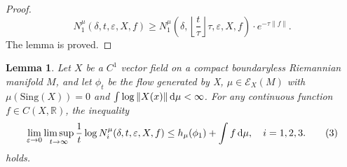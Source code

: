 \documentclass[10pt]{article}
\newtheorem*{Theorem A}{Theorem A}
\newtheorem{Lemma}[Theorem]{Lemma}
\newcommand{\dmu}{\,{\rm d}\mu}
\newcommand{\norm}[1]{\|#1\|}
\begin{document}
\begin{proof}
\[N_1^\mu(\delta, t, \varepsilon, X, f)\geq N_1^\mu\left( \delta, \left\lfloor \frac{t}{\tau} \right\rfloor\tau, \varepsilon, X, f\right)
\cdot e^{-\tau\|f\|  }.\]
The lemma is proved.
\end{proof}

\begin{Lemma}\label{lemma4.4}
Let \( X \) be a \( C^1 \) vector field on a compact boundaryless Riemannian manifold \( M \), and let \( \phi_t \) be the flow generated by   X, \( \mu \in \mathcal{E}_X(M) \) with \( \mu(\text{Sing}(X)) = 0 \) and \( \int \log \norm{X(x)} \dmu < \infty \). For any continuous function \( f \in C(X, \mathbb{R}) \), the inequality
\[
\lim_{\varepsilon \to 0} \limsup_{t \to \infty} \frac{1}{t} \log N_i^\mu(\delta, t, \varepsilon, X, f)
\leq h_\mu(\phi_1) + \int f \, {\rm d}\mu,\quad i = 1, 2, 3. \tag{3}
\]
holds.
\end{Lemma}
\end{document}
